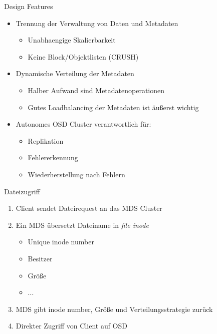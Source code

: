 \documentclass[hyperref={xetex}]{beamer}
\begin{document}
\begin{frame}{Design Features}
	\begin{itemize}
		\item Trennung der Verwaltung von Daten und Metadaten
		\begin{itemize}
			\item Unabhaengige Skalierbarkeit
			\item Keine Block/Objektlisten (CRUSH)
		\end{itemize}
		\item  Dynamische Verteilung der Metadaten
		\begin{itemize}
			\item Halber Aufwand sind Metadatenoperationen
			\item Gutes Loadbalancing der Metadaten ist \"außerst wichtig %
		\end{itemize}
		\item Autonomes OSD Cluster verantwortlich f\"ur:
			\begin{itemize}
				\item Replikation
				\item Fehlererkennung
				\item Wiederherstellung nach Fehlern
			\end{itemize}
	\end{itemize}	
\end{frame}

\begin{frame}{Dateizugriff}

\begin{enumerate}
	\item Client sendet Dateirequest an das MDS Cluster
	\item Ein MDS \"ubersetzt Dateiname in \textit{file inode}
	\begin{itemize}
		\item Unique inode number
		\item Besitzer
		\item Gr\"oße
		\item ...
	\end{itemize}
	\item MDS gibt inode number, Gr\"oße und Verteilungsstrategie zur\"uck
	\item Direkter Zugriff von Client auf OSD
\end{enumerate}
\end{frame}
\end{document}
